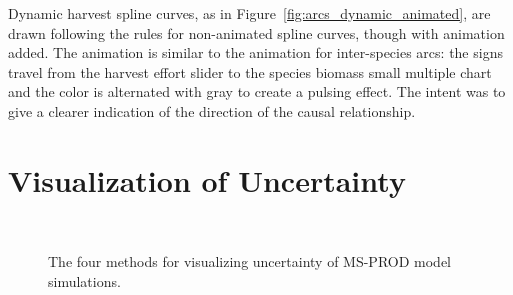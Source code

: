 Dynamic harvest spline curves, as in Figure~\ref{fig:arcs_dynamic_animated}, are drawn following the rules for non-animated spline curves, though with animation added.  The animation is similar to the animation for inter-species arcs:  the signs travel from the harvest effort slider to the species biomass small multiple chart and the color is alternated with gray to create a pulsing effect.  The intent was to give a clearer indication of the direction of the causal relationship.

\section{Visualization of Uncertainty}

\begin{figure}
\centering
	 \qquad
	 
	 \\
	
	  \qquad
	
	
	\caption[The four methods for visualizing uncertainty of MS-PROD model simulations]{The four methods for visualizing uncertainty of MS-PROD model simulations.}
	\label{fig:uncertainty}
\end{figure}

